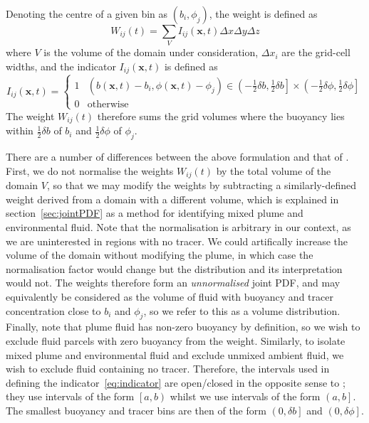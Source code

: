 \documentclass[a4paper]{article}
\begin{document}
Denoting the centre of a given bin as $(b_i, \phi_j)$, the weight is defined as
\begin{equation}
	W_{ij}(t) = \sum_V I_{ij}(\bm{x},t) \Delta x \Delta y \Delta z
\end{equation}
where $V$ is the volume of the domain under consideration, $\Delta x_i$ are the grid-cell widths, and the
indicator $I_{ij}(\bm{x},t)$ is defined as
\begin{equation}
	I_{ij}(\bm{x}, t) = \begin{cases}
		1 & \left(b(\bm{x},t) - b_i, \phi(\bm{x},t) - \phi_j\right) \in \left( -\frac{1}{2}\delta b,
		\frac{1}{2}\delta b \right] \times \left( -\frac{1}{2}\delta \phi, \frac{1}{2}\delta \phi \right] \\
			0 & \text{otherwise}
		\end{cases}
		\label{eq:indicator}
\end{equation}
The weight $W_{ij}(t)$ therefore sums the grid volumes where the buoyancy lies within $\frac{1}{2}\delta b$ of
$b_i$ and $\frac{1}{2}\delta \phi$ of $\phi_j$.

There are a number of differences between the above formulation and that of \citet{penney2020}. First, we do
not normalise the weights $W_{ij}(t)$ by the total volume of the domain $V$, so that we may modify the weights
by subtracting a similarly-defined weight derived from a domain with a different volume, which is explained in
section~\ref{sec:jointPDF} as a method for identifying mixed plume and environmental fluid. Note that the
normalisation is arbitrary in our context, as we are uninterested in regions with no tracer. We could
artifically increase the volume of the domain without modifying the plume, in which case the normalisation
factor would change but the distribution and its interpretation would not. The weights therefore form an
\emph{unnormalised} joint PDF, and may equivalently be considered as the volume of fluid with buoyancy and
tracer concentration close to $b_i$ and $\phi_j$, so we refer to this as a volume distribution. Finally, note
that plume fluid has non-zero buoyancy by definition, so we wish to exclude fluid parcels with zero buoyancy
from the weight. Similarly, to isolate mixed plume and environmental fluid and exclude unmixed ambient fluid,
we wish to exclude fluid containing no tracer. Therefore, the intervals used in defining the
indicator~\eqref{eq:indicator} are open/closed in the opposite sense to \citet{penney2020}; they use intervals
of the form $\left[a, b\right)$ whilst we use intervals of the form $\left(a, b\right]$. The smallest buoyancy
and tracer bins are then of the form $\left(0, \delta b\right]$ and $\left(0, \delta \phi\right]$. 
\end{document}
